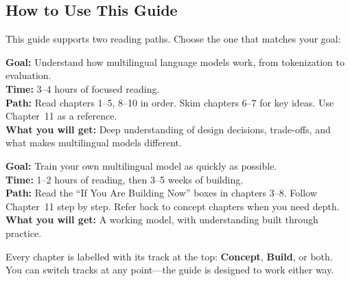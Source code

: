 \documentclass[11pt,a4paper]{article}
\begin{document}
\vspace{12pt}


\subsection*{How to Use This Guide}

This guide supports two reading paths. Choose the one that matches your goal:

\begin{tcolorbox}[colback=tipbg, colframe=tipborder, fonttitle=\bfseries, title={Track A --- Learn the Concepts}]
\textbf{Goal:} Understand how multilingual language models work, from tokenization to evaluation.\\
\textbf{Time:} 3--4 hours of focused reading.\\
\textbf{Path:} Read chapters 1--5, 8--10 in order. Skim chapters 6--7 for key ideas. Use Chapter~11 as a reference.\\
\textbf{What you will get:} Deep understanding of design decisions, trade-offs, and what makes multilingual models different.
\end{tcolorbox}

\vspace{6pt}

\begin{tcolorbox}[colback=lightaccent, colframe=accent, fonttitle=\bfseries, title={Track B --- Build First}]
\textbf{Goal:} Train your own multilingual model as quickly as possible.\\
\textbf{Time:} 1--2 hours of reading, then 3--5 weeks of building.\\
\textbf{Path:} Read the ``If You Are Building Now'' boxes in chapters 3--8. Follow Chapter~11 step by step. Refer back to concept chapters when you need depth.\\
\textbf{What you will get:} A working model, with understanding built through practice.
\end{tcolorbox}

\vspace{6pt}

Every chapter is labelled with its track at the top: \textbf{Concept}, \textbf{Build}, or both. You can switch tracks at any point---the guide is designed to work either way.
\end{document}

